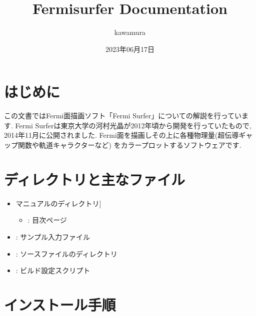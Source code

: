 \documentclass[letterpaper,10pt,dvipdfmx,openany]{sphinxmanual}
\title{Fermisurfer Documentation}
\date{2023年06月17日}
\author{kawamura}
\begin{document}
\pagestyle{empty}
\sphinxmaketitle
\pagestyle{plain}
\sphinxtableofcontents
\pagestyle{normal}
\label{\detokenize{index::doc}}


\sphinxstepscope


\chapter{はじめに}
\label{\detokenize{overview:id1}}\label{\detokenize{overview::doc}}
\sphinxAtStartPar
この文書ではFermi面描画ソフト「Fermi Surfer」についての解説を行っています.
Fermi Surferは東京大学の河村光晶が2012年頃から開発を行っていたもので,
2014年11月に公開されました.
Fermi面を描画しその上に各種物理量(超伝導ギャップ関数や軌道キャラクターなど)
をカラープロットするソフトウェアです.

\sphinxstepscope


\chapter{ディレクトリと主なファイル}
\label{\detokenize{file:id1}}\label{\detokenize{file::doc}}\begin{itemize}
\item {} \begin{description}
\sphinxlineitem{\sphinxcode{\sphinxupquote{doc/}}}{[}マニュアルのディレクトリ{]}\begin{itemize}
\item {} 
\sphinxAtStartPar
{} : 目次ページ

\end{itemize}

\end{description}

\item {} 
\sphinxAtStartPar
{} : サンプル入力ファイル

\item {} 
\sphinxAtStartPar
{} : ソースファイルのディレクトリ

\item {} 
\sphinxAtStartPar
{} : ビルド設定スクリプト

\end{itemize}

\sphinxstepscope


\chapter{インストール手順}
\label{\detokenize{install:id1}}\label{\detokenize{install::doc}}
\end{document}
